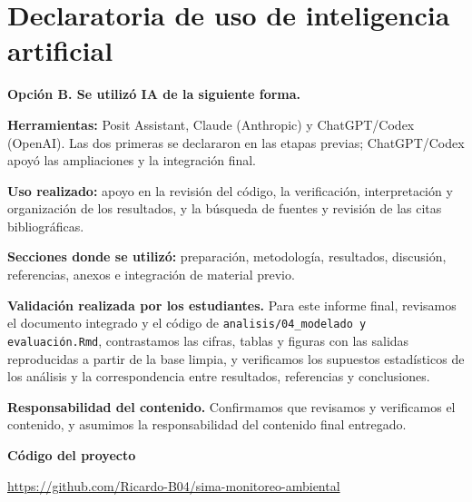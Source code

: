 \documentclass[11pt,letterpaper]{article}
\begin{document}
\section*{Declaratoria de uso de inteligencia artificial}
\textbf{Opción B. Se utilizó IA de la siguiente forma.}

\textbf{Herramientas:} Posit Assistant, Claude (Anthropic) y ChatGPT/Codex (OpenAI). Las dos primeras se declararon en las etapas previas; ChatGPT/Codex apoyó las ampliaciones y la integración final.

\textbf{Uso realizado:} apoyo en la revisión del código, la verificación, interpretación y organización de los resultados, y la búsqueda de fuentes y revisión de las citas bibliográficas.

\textbf{Secciones donde se utilizó:} preparación, metodología, resultados, discusión, referencias, anexos e integración de material previo.

\textbf{Validación realizada por los estudiantes.} Para este informe final, revisamos el documento integrado y el código de \texttt{analisis/04\_modelado y evaluación.Rmd}, contrastamos las cifras, tablas y figuras con las salidas reproducidas a partir de la base limpia, y verificamos los supuestos estadísticos de los análisis y la correspondencia entre resultados, referencias y conclusiones.

\textbf{Responsabilidad del contenido.} Confirmamos que revisamos y verificamos el contenido, y asumimos la responsabilidad del contenido final entregado.

\vfill
\textbf{Código del proyecto}

\url{https://github.com/Ricardo-B04/sima-monitoreo-ambiental}
\end{document}
